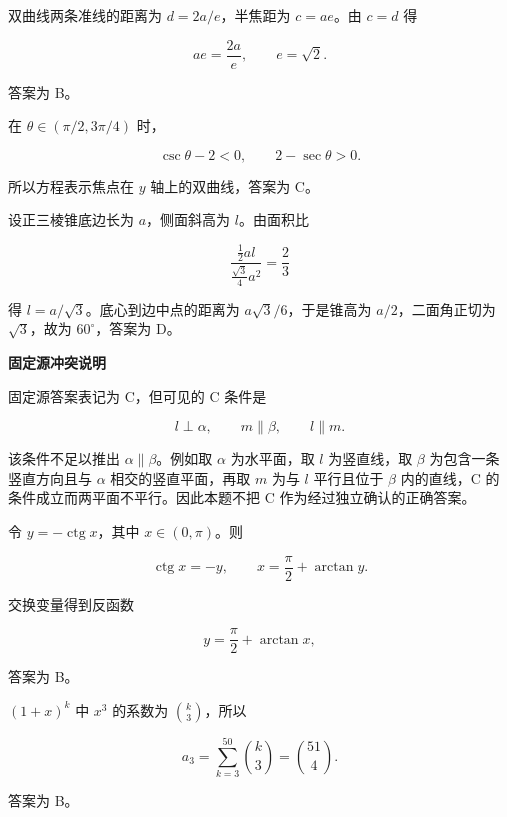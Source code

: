 \begin{answer}
双曲线两条准线的距离为 $d=2a/e$，半焦距为 $c=ae$。由 $c=d$ 得

\nopagebreak[4]
\[
ae=\frac{2a}{e},
\qquad e=\sqrt2.
\]

答案为 B。


在 $\theta\in(\pi/2,3\pi/4)$ 时，

\nopagebreak[4]
\[
\csc\theta-2<0,\qquad 2-\sec\theta>0.
\]

所以方程表示焦点在 $y$ 轴上的双曲线，答案为 C。


设正三棱锥底边长为 $a$，侧面斜高为 $l$。由面积比

\nopagebreak[4]
\[
\frac{\frac12al}{\frac{\sqrt3}{4}a^2}=\frac23
\]

得 $l=a/\sqrt3$。底心到边中点的距离为 $a\sqrt3/6$，于是锥高为 $a/2$，二面角正切为 $\sqrt3$，故为 $60^\circ$，答案为 D。


\textbf{固定源冲突说明}

固定源答案表记为 C，但可见的 C 条件是

\nopagebreak[4]
\[
l\perp\alpha,\qquad m\parallel\beta,\qquad l\parallel m.
\]

该条件不足以推出 $\alpha\parallel\beta$。例如取 $\alpha$ 为水平面，取 $l$ 为竖直线，取 $\beta$ 为包含一条竖直方向且与 $\alpha$ 相交的竖直平面，再取 $m$ 为与 $l$ 平行且位于 $\beta$ 内的直线，C 的条件成立而两平面不平行。因此本题不把 C 作为经过独立确认的正确答案。


令 $y=-\operatorname{ctg}x$，其中 $x\in(0,\pi)$。则

\nopagebreak[4]
\[
\operatorname{ctg}x=-y,
\qquad
x=\frac\pi2+\arctan y.
\]

交换变量得到反函数

\nopagebreak[4]
\[
y=\frac\pi2+\arctan x,
\]

答案为 B。


$(1+x)^k$ 中 $x^3$ 的系数为 $\binom{k}{3}$，所以

\nopagebreak[4]
\[
a_3=\sum_{k=3}^{50}\binom{k}{3}
=\binom{51}{4}.
\]

答案为 B。



\end{answer}
